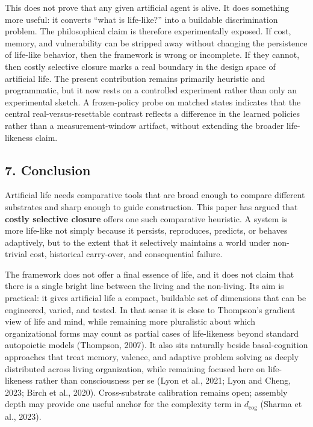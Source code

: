 \documentclass[Afour,sageh,times,doublespace]{sagej}
\begin{document}
This does not prove that any given artificial agent is alive. It does something more useful: it converts ``what is life-like?'' into a buildable discrimination problem. The philosophical claim is therefore experimentally exposed. If cost, memory, and vulnerability can be stripped away without changing the persistence of life-like behavior, then the framework is wrong or incomplete. If they cannot, then costly selective closure marks a real boundary in the design space of artificial life. The present contribution remains primarily heuristic and programmatic, but it now rests on a controlled experiment rather than only an experimental sketch. A frozen-policy probe on matched states indicates that the central real-versus-resettable contrast reflects a difference in the learned policies rather than a measurement-window artifact, without extending the broader life-likeness claim.

\subsection{7. Conclusion}\label{conclusion}

Artificial life needs comparative tools that are broad enough to compare different substrates and sharp enough to guide construction. This paper has argued that \textbf{costly selective closure} offers one such comparative heuristic. A system is more life-like not simply because it persists, reproduces, predicts, or behaves adaptively, but to the extent that it selectively maintains a world under non-trivial cost, historical carry-over, and consequential failure.

The framework does not offer a final essence of life, and it does not claim that there is a single bright line between the living and the non-living. Its aim is practical: it gives artificial life a compact, buildable set of dimensions that can be engineered, varied, and tested. In that sense it is close to Thompson's gradient view of life and mind, while remaining more pluralistic about which organizational forms may count as partial cases of life-likeness beyond standard autopoietic models (Thompson, 2007). It also sits naturally beside basal-cognition approaches that treat memory, valence, and adaptive problem solving as deeply distributed across living organization, while remaining focused here on life-likeness rather than consciousness per se (Lyon et al., 2021; Lyon and Cheng, 2023; Birch et al., 2020). Cross-substrate calibration remains open; assembly depth may provide one useful anchor for the complexity term in \(d_{\mathrm{cog}}\) (Sharma et al., 2023).
\end{document}
